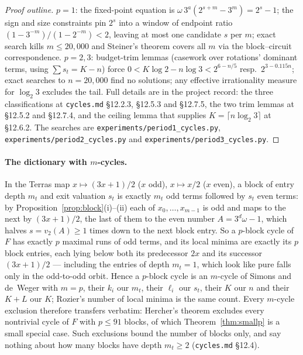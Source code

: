 \documentclass[11pt]{article}
\theoremstyle{remark}
\newcommand{\vt}[1]{v_2\!\left(#1\right)}
\newcommand{\w}{\omega}
\newcommand{\LL}{\log_2 3}
\begin{document}
\begin{proof}[Proof outline]
$p=1$: the fixed-point equation is $\w\,3^a(2^{s+m}-3^m) = 2^s-1$; the sign and size constraints pin $2^s$ into a window of endpoint ratio $(1-3^{-m})/(1-2^{-m}) < 2$, leaving at most one candidate $s$ per $m$; exact search kills $m \le 20{,}000$ and Steiner's theorem \cite{steiner} covers all $m$ via the block--circuit correspondence. $p=2,3$: budget-trim lemmas (casework over rotations' dominant terms, using $\sum s_t = K - n$) force $0 < K\log2 - n\log3 < 2^{6-n/5}$ resp.\ $2^{3-0.115n}$; exact searches to $n = 20{,}000$ find no solutions; any effective irrationality measure for $\LL$ \cite{rhin} excludes the tail. Full details are in the project record: the three classifications at \texttt{cycles.md} \S12.2.3, \S12.5.3 and \S12.7.5, the two trim lemmas at \S12.5.2 and \S12.7.4, and the ceiling lemma that supplies $K = \lceil n\LL\rceil$ at \S12.6.2. The searches are \texttt{experiments/period1\_cycles.py}, \texttt{experiments/period2\_cycles.py} and \texttt{experiments/period3\_cycles.py}.
\end{proof}

\paragraph{The dictionary with $m$-cycles.} In the Terras map $x \mapsto (3x+1)/2$ ($x$ odd), $x \mapsto x/2$ ($x$ even), a block of entry depth $m_t$ and exit valuation $s_t$ is exactly $m_t$ odd terms followed by $s_t$ even terms: by Proposition~\ref{prop:block}(i)--(ii) each of $x_0,\dots,x_{m-1}$ is odd and maps to the next by $(3x+1)/2$, the last of them to the even number $A = 3^d\w - 1$, which halves $s = \vt{A} \ge 1$ times down to the next block entry. So a $p$-block cycle of $F$ has exactly $p$ maximal runs of odd terms, and its local minima are exactly its $p$ block entries, each lying below both its predecessor $2x$ and its successor $(3x+1)/2$ --- including the entries of depth $m_t = 1$, which look like pure falls only in the odd-to-odd orbit. Hence a $p$-block cycle is an $m$-cycle of Simons and de~Weger \cite{sdw} with $m = p$, their $k_i$ our $m_t$, their $\ell_i$ our $s_t$, their $K$ our $n$ and their $K+L$ our $K$; Rozier's number of local minima \cite{rozier91} is the same count. Every $m$-cycle exclusion therefore transfers verbatim: Hercher's theorem \cite{hercher} excludes every nontrivial cycle of $F$ with $p \le 91$ blocks, of which Theorem~\ref{thm:smallp} is a small special case. Such exclusions bound the number of blocks only, and say nothing about how many blocks have depth $m_t \ge 2$ (\texttt{cycles.md} \S12.4).
\end{document}

